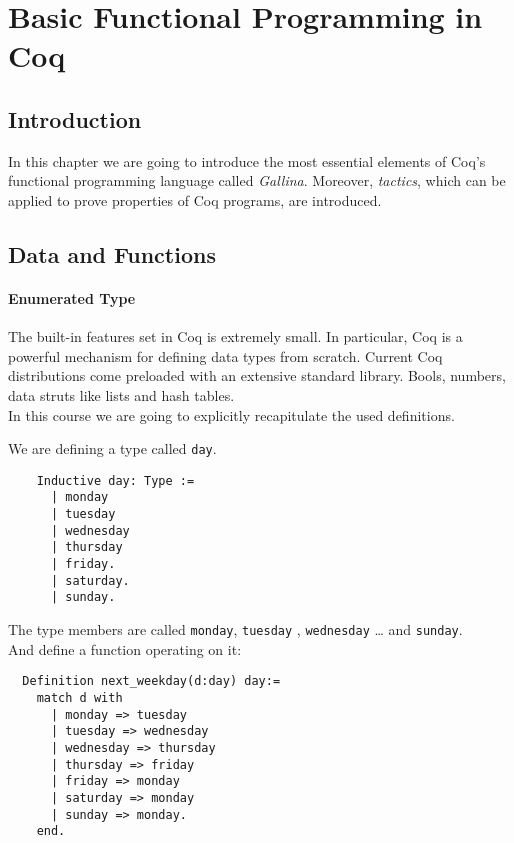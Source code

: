 \section{Basic Functional Programming in Coq}




\subsection{Introduction}

In this chapter we are going to introduce the most essential elements of Coq's functional programming language called {\itshape  Gallina}. 
Moreover, {\itshape tactics}, which can be applied to prove properties of Coq programs, are introduced.


\subsection{Data and Functions}

 \paragraph{Enumerated Type}
 
  The built-in features set in Coq is extremely small. In particular, Coq is a powerful mechanism for defining data types from scratch.
  Current Coq distributions come preloaded with an extensive standard library.
  Bools, numbers, data struts like lists and hash tables.\\
  In this course we are going to explicitly recapitulate the used definitions.
   
  
  \begin{example}
  We are defining a type called \lstinline!day!.
  \begin{lstlisting}
    Inductive day: Type :=
	  | monday
	  | tuesday
	  | wednesday
	  | thursday
	  | friday.
	  | saturday.
	  | sunday.
	  \end{lstlisting} 
  
  The type members are called \lstinline!monday!, \lstinline!tuesday! , \lstinline!wednesday! \ldots{} and \lstinline!sunday!.\\
  
  And define a function operating on it: 
  \begin{lstlisting}
  Definition next_weekday(d:day) day:=
    match d with 
	  | monday => tuesday
	  | tuesday => wednesday
	  | wednesday => thursday
	  | thursday => friday
	  | friday => monday
	  | saturday => monday
	  | sunday => monday.
    end.  
  \end{lstlisting}
  \end{example}

